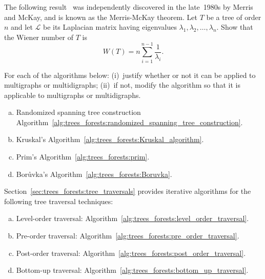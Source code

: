 \begin{problem}
\item The following result~\cite{MoharEtAl1993} was independently
  discovered in the late~1980s by Merris and McKay, and is known as
  the Merris-McKay theorem. Let $T$ be a
  tree of order $n$ and let $\mathcal{L}$ be its
  Laplacian matrix having
  eigenvalues
  $\lambda_1, \lambda_2, \dots, \lambda_n$. Show that the
  Wiener number of $T$ is
  \[
  W(T)
  =
  n \sum_{i=1}^{n-1} \frac{1}{\lambda_i}.
  \]

\item For each of the algorithms below: (i)~justify whether or not
  it can be applied to multigraphs or multidigraphs; (ii)~if not,
  modify the algorithm so that it is applicable to multigraphs or
  multidigraphs.
  \begin{enumerate}[(a)]
  \item Randomized
    spanning tree construction
    Algorithm~\ref{alg:trees_forests:randomized_spanning_tree_construction}.

  \item Kruskal's
    Algorithm~\ref{alg:trees_forests:Kruskal_algorithm}.

  \item Prim's
    Algorithm~\ref{alg:trees_forests:prim}.

  \item Bor\r{u}vka's
    Algorithm~\ref{alg:trees_forests:Boruvka}.
  \end{enumerate}

\item Section~\ref{sec:trees_forests:tree_traversals} provides
  iterative algorithms for the following tree traversal techniques:
  \begin{enumerate}[(a)]
  \item Level-order traversal:
    Algorithm~\ref{alg:trees_forests:level_order_traversal}.

  \item Pre-order traversal:
    Algorithm~\ref{alg:trees_forests:pre_order_traversal}.

  \item Post-order traversal:
    Algorithm~\ref{alg:trees_forests:post_order_traversal}.

  \item Bottom-up traversal:
    Algorithm~\ref{alg:trees_forests:bottom_up_traversal}.


\end{enumerate}
\end{problem}
